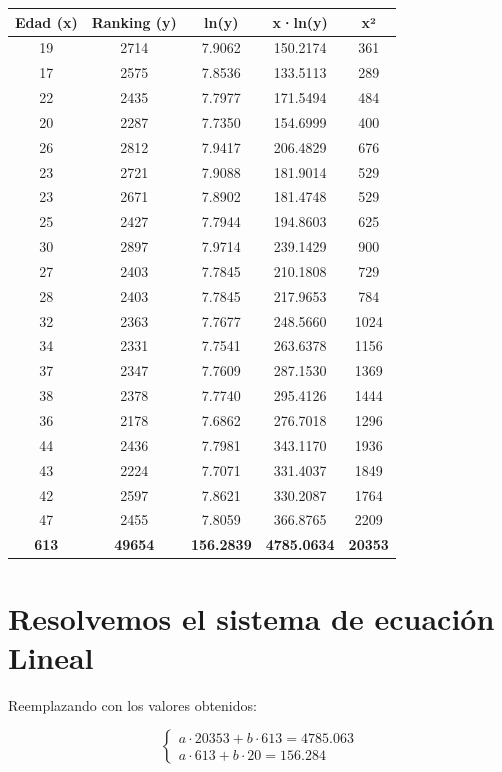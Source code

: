 \documentclass[12pt]{article}
\begin{document}
\begin{center}
\renewcommand{\arraystretch}{1.2}
\begin{tabular}{|c|c|c|c|c|}
\hline
\textbf{Edad (x)} & \textbf{Ranking (y)} & \textbf{ln(y)} & \textbf{x·ln(y)} & \textbf{x²} \\
\hline
19 & 2714 & 7.9062 & 150.2174 & 361 \\
17 & 2575 & 7.8536 & 133.5113 & 289 \\
22 & 2435 & 7.7977 & 171.5494 & 484 \\
20 & 2287 & 7.7350 & 154.6999 & 400 \\
26 & 2812 & 7.9417 & 206.4829 & 676 \\
23 & 2721 & 7.9088 & 181.9014 & 529 \\
23 & 2671 & 7.8902 & 181.4748 & 529 \\
25 & 2427 & 7.7944 & 194.8603 & 625 \\
30 & 2897 & 7.9714 & 239.1429 & 900 \\
27 & 2403 & 7.7845 & 210.1808 & 729 \\
28 & 2403 & 7.7845 & 217.9653 & 784 \\
32 & 2363 & 7.7677 & 248.5660 & 1024 \\
34 & 2331 & 7.7541 & 263.6378 & 1156 \\
37 & 2347 & 7.7609 & 287.1530 & 1369 \\
38 & 2378 & 7.7740 & 295.4126 & 1444 \\
36 & 2178 & 7.6862 & 276.7018 & 1296 \\
44 & 2436 & 7.7981 & 343.1170 & 1936 \\
43 & 2224 & 7.7071 & 331.4037 & 1849 \\
42 & 2597 & 7.8621 & 330.2087 & 1764 \\
47 & 2455 & 7.8059 & 366.8765 & 2209 \\
\hline
\textbf{613} & \textbf{49654} & \textbf{156.2839} & \textbf{4785.0634} & \textbf{20353} \\
\hline
\end{tabular}
\end{center}

\vspace{1cm}
\section*{Resolvemos el sistema de ecuación Lineal}


Reemplazando con los valores obtenidos:

\[
\left\{
\begin{array}{l}
a \cdot 20353 + b \cdot 613 = 4785.063 \\
a \cdot 613 + b \cdot 20 = 156.284
\end{array}
\right.
\]
\end{document}
